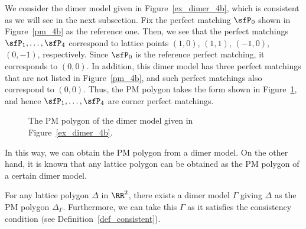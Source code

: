 \begin{Example}
We consider the dimer model given in Figure~\ref{ex_dimer_4b}, which is consistent as we will see in the next subsection.
Fix the perfect matching $\sfP_0$ shown in Figure~\ref{pm_4b} as the reference one.
Then, we see that the perfect matchings $\sfP_1,\dots,\sfP_4$ correspond to lattice points $(1,0)$, $(1,1)$, $(-1,0)$, $(0,-1)$, respectively.
Since $\sfP_0$ is the reference perfect matching, it corresponds to $(0,0)$.
In addition, this dimer model has three perfect matchings that are not listed in Figure~\ref{pm_4b},
and such perfect matchings also correspond to $(0,0)$.
Thus, the PM polygon takes the form shown in Figure~\ref{polygon_4b}, and hence $\sfP_1,\dots,\sfP_4$ are corner perfect matchings.

\begin{figure}[h!]\centering
{}
\caption{The PM polygon of the dimer model given in Figure~\ref{ex_dimer_4b}.}\label{polygon_4b}
\end{figure}
\end{Example}

In this way, we can obtain the PM polygon from a dimer model.
On the other hand, it is known that any lattice polygon can be obtained as the PM polygon of a certain dimer model.

\begin{Theorem}\label{existence_dimer}
For any lattice polygon $\Delta$ in $\RR^2$, there exists a dimer model $\Gamma$ giving $\Delta$ as the PM polygon $\Delta_\Gamma$.
Furthermore, we can take this $\Gamma$ as it satisfies the consistency condition $($see Definition~{\rm \ref{def_consistent})}.
\end{Theorem}

